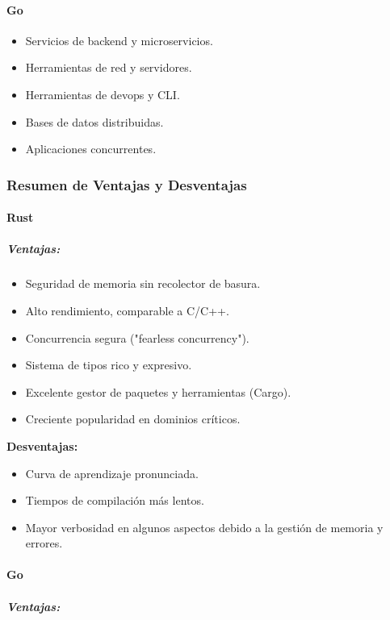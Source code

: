 \paragraph{Go}

\begin{itemize}
    \item Servicios de backend y microservicios.
    \item Herramientas de red y servidores.
    \item Herramientas de \gls{devops} y CLI.
    \item Bases de datos distribuidas.
    \item Aplicaciones concurrentes.
\end{itemize}

\subsubsection{Resumen de Ventajas y Desventajas}

\paragraph{Rust}
\subparagraph{Ventajas:}
\begin{itemize}
    \item Seguridad de memoria sin recolector de basura.
    \item Alto rendimiento, comparable a C/C++.
    \item Concurrencia segura ("fearless concurrency").
    \item Sistema de tipos rico y expresivo.
    \item Excelente gestor de paquetes y herramientas (Cargo).
    \item Creciente popularidad en dominios críticos.
\end{itemize}
\textbf{Desventajas:}
\begin{itemize}
    \item Curva de aprendizaje pronunciada.
    \item Tiempos de compilación más lentos.
    \item Mayor verbosidad en algunos aspectos debido a la gestión de memoria y errores.
\end{itemize}

\paragraph{Go}
\subparagraph{Ventajas:}


